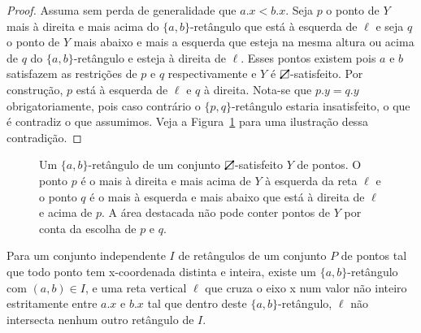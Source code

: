 \begin{proof}
    Assuma sem perda de generalidade que $a.x < b.x$.
    Seja $p$ o ponto de $Y$ mais à direita e mais acima do $\{a,b\}$-retângulo que está à esquerda de $\ell$ e seja $q$ o ponto de $Y$ mais abaixo e mais a esquerda que esteja na mesma altura ou acima de $q$ do $\{a,b\}$-retângulo e esteja à direita de $\ell$. Esses pontos existem pois $a$ e $b$ satisfazem as restrições de $p$ e $q$ respectivamente e $Y$ é $\rectpos$-satisfeito. Por construção, $p$ está à esquerda de $\ell$ e $q$ à direita. Nota-se que $p.y = q.y$ obrigatoriamente, pois caso contrário o $\{p,q\}$-retângulo estaria insatisfeito, o que é contradiz o que assumimos. Veja a Figura~\ref{fig:contraexemplo_contradicao} para uma ilustração dessa contradição.
\end{proof}

\begin{figure}
    \caption{Um $\{a,b\}$-retângulo de um conjunto $\protect\rectpos$-satisfeito $Y$ de pontos. O ponto $p$ é o mais à direita e mais acima de $Y$ à esquerda da reta $\ell$ e o ponto $q$ é o mais à esquerda e mais abaixo que está à direita de $\ell$ e acima de $p$. A área destacada não pode conter pontos de $Y$ por conta da escolha de $p$ e $q$.}
\label{fig:contraexemplo_contradicao}
\end{figure}
\begin{lemma} \label{lema_6.3}
    Para um conjunto independente $I$ de retângulos de um conjunto $P$ de pontos tal que todo ponto tem x-coordenada distinta e inteira, existe um $\{a,b\}$-retângulo com $(a,b) \in I$, e uma reta vertical $\ell$ que cruza o eixo x num valor não inteiro estritamente entre $a.x$ e $b.x$ tal que dentro deste $\{a,b\}$-retângulo, $\ell$ não intersecta nenhum outro retângulo de $I$.
\end{lemma}


